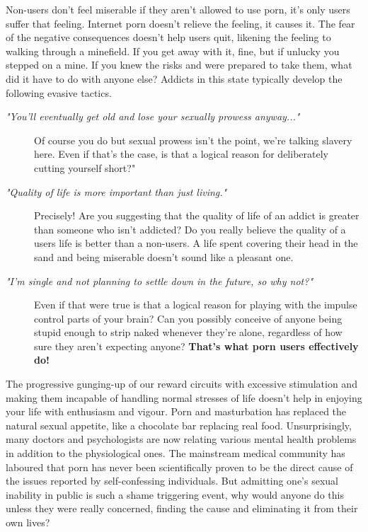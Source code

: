 \documentclass[easypeasy.tex]{subfiles}
\begin{document}
Non-users don't feel miserable if they aren't allowed to use porn, it's only users suffer that feeling. Internet porn doesn't relieve the feeling, it causes it. The fear of the negative consequences doesn't help users quit, likening the feeling to walking through a minefield. If you get away with it, fine, but if unlucky you stepped on a mine. If you knew the risks and were prepared to take them, what did it have to do with anyone else? Addicts in this state typically develop the following evasive tactics.
\begin{description}
  \item [\textit{"You'll eventually get old and lose your sexually prowess anyway..."}] Of course you do but sexual prowess isn't the point, we're talking slavery here. Even if that's the case, is that a logical reason for deliberately cutting yourself short?"

  \item  [ \textit{"Quality of life is more important than just living."}] Precisely! Are you suggesting that the quality of life of an addict is greater than someone who isn't addicted? Do you really believe the quality of a users life is better than a non-users. A life spent covering their head in the sand and being miserable doesn't sound like a pleasant one.

  \item [\textit{"I'm single and not planning to settle down in the future, so why not?"}] Even if that were true is that a logical reason for playing with the impulse control parts of your brain? Can you possibly conceive of anyone being stupid enough to strip naked whenever they're alone, regardless of how sure they aren't expecting anyone? \textbf{That's what porn users effectively do!}
\end{description}

The progressive gunging-up of our reward circuits with excessive stimulation and making them incapable of handling normal stresses of life doesn't help in enjoying your life with enthusiasm and vigour. Porn and masturbation has replaced the natural sexual appetite, like a chocolate bar replacing real food. Unsurprisingly, many doctors and psychologists are now relating various mental health problems in addition to the physiological ones. The mainstream medical community has laboured that porn has never been scientifically proven to be the direct cause of the issues reported by self-confessing individuals. But admitting one's sexual inability in public is such a shame triggering event, why would anyone do this unless they were really concerned, finding the cause and eliminating it from their own lives?
\end{document}
